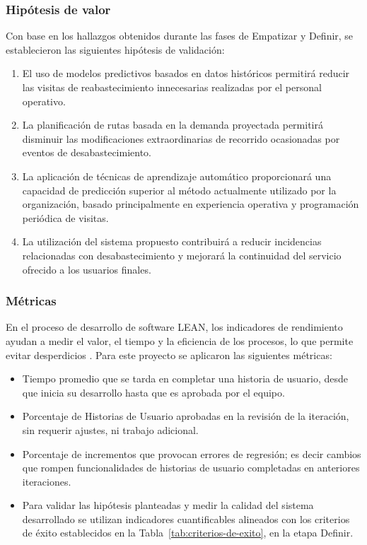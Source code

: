 \subsubsection{Hipótesis de valor}\label{hipuxf3tesis-de-valor}

Con base en los hallazgos obtenidos durante las fases de Empatizar y Definir, se establecieron las siguientes hipótesis de validación:

\begin{enumerate}
\def\labelenumi{\arabic{enumi}.}
\item
  El uso de modelos predictivos basados en datos históricos permitirá reducir las visitas de reabastecimiento innecesarias realizadas por el personal operativo.
\item
  La planificación de rutas basada en la demanda proyectada permitirá disminuir las modificaciones extraordinarias de recorrido ocasionadas por eventos de desabastecimiento.
\item
  La aplicación de técnicas de aprendizaje automático proporcionará una capacidad de predicción superior al método actualmente utilizado por la organización, basado principalmente en experiencia operativa y programación periódica de visitas.
\item
  La utilización del sistema propuesto contribuirá a reducir incidencias relacionadas con desabastecimiento y mejorará la continuidad del servicio ofrecido a los usuarios finales.
\end{enumerate}

\subsubsection{Métricas}\label{muxe9tricas}

En el proceso de desarrollo de software LEAN, los indicadores de rendimiento ayudan a medir el valor, el tiempo y la eficiencia de los procesos, lo que permite evitar desperdicios \citep{paladiy2026}. Para este proyecto se aplicaron las siguientes métricas:

\begin{itemize}
\item
  Tiempo promedio que se tarda en completar una historia de usuario, desde que inicia su desarrollo hasta que es aprobada por el equipo.
\item
  Porcentaje de Historias de Usuario aprobadas en la revisión de la iteración, sin requerir ajustes, ni trabajo adicional.
\item
  Porcentaje de incrementos que provocan errores de regresión; es decir cambios que rompen funcionalidades de historias de usuario completadas en anteriores iteraciones.
\item
  Para validar las hipótesis planteadas y medir la calidad del sistema desarrollado se utilizan indicadores cuantificables alineados con los criterios de éxito establecidos en la Tabla~\ref{tab:criterios-de-exito}, en la etapa Definir.
\end{itemize}

